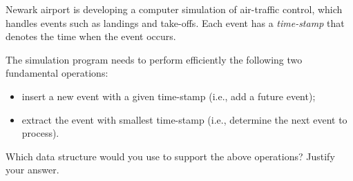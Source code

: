 Newark airport is developing a computer simulation of air-traffic
control, which handles events such as landings and take-offs.  Each
event has a {\em time-stamp} that denotes the time when the event
occurs.

The simulation program needs to perform efficiently the following two
fundamental operations:

\begin{itemize}

\item    insert a new event with a given time-stamp
	(i.e., add a future event);

\item    extract the event with smallest time-stamp
	(i.e., determine the next event to process).

\end{itemize}

Which data structure would you use to support the above operations?
Justify your answer.
